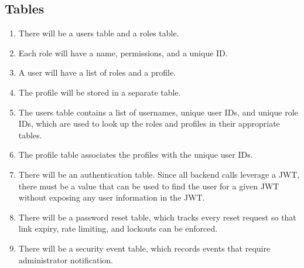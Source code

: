     \subsection{Tables}
        \begin{enumerate}[leftmargin=3\parindent]
            \item There will be a users table and a roles table.
            \item Each role will have a name, permissions, and a unique ID.
            \item A user will have a list of roles and a profile.
            \item The profile will be stored in a separate table.
            \item The users table contains a list of usernames, unique user IDs, and unique role IDs, which are used to look up the roles and profiles in their appropriate tables.
            \item The profile table associates the profiles with the unique user IDs.
            \item There will be an authentication table. Since all backend calls leverage a JWT, there must be a value that can be used to find the user for a given JWT without exposing any user information in the JWT.
            \item There will be a password reset table, which tracks every reset request so that link expiry, rate limiting, and lockouts can be enforced.
            \item There will be a security event table, which records events that require administrator notification.
        \end{enumerate}

